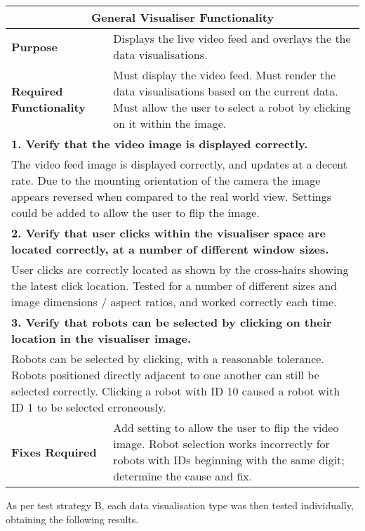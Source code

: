 \clearpage

\begin{longtable}{ l p{10cm} }
 \hline
 \multicolumn{2}{c}{\textbf{General Visualiser Functionality}}\\
 \hline
 \textbf{Purpose} & Displays the live video feed and overlays the the data visualisations.\\
 \textbf{Required Functionality} & Must display the video feed. Must render the data visualisations based on the current data. Must allow the user to select a robot by clicking on it within the image.\\
 \hline
 \multicolumn{2}{p{14cm}}{\textbf{1. Verify that the video image is displayed correctly.}}\\
 \multicolumn{2}{p{14cm}}{The video feed image is displayed correctly, and updates at a decent rate. Due to the mounting orientation of the camera the image appears reversed when compared to the real world view. Settings could be added to allow the user to flip the image. }\\
 \hline
 \multicolumn{2}{p{14cm}}{\textbf{2. Verify that user clicks within the visualiser space are located correctly, at a number of different window sizes.}}\\
 \multicolumn{2}{p{14cm}}{User clicks are correctly located as shown by the cross-hairs showing the latest click location. Tested for a number of different sizes and image dimensions / aspect ratios, and worked correctly each time.}\\
 \hline
 \multicolumn{2}{p{14cm}}{\textbf{3. Verify that robots can be selected by clicking on their location in the visualiser image.}}\\
 \multicolumn{2}{p{14cm}}{Robots can be selected by clicking, with a reasonable tolerance. Robots positioned directly adjacent to one another can still be selected correctly. Clicking a robot with ID 10 caused a robot with ID 1 to be selected erroneously.}\\
 \hline
 \textbf{Fixes Required} & Add setting to allow the user to flip the video image. Robot selection works incorrectly for robots with IDs beginning with the same digit; determine the cause and fix.\\
 \bottomrule
\end{longtable}

As per test strategy B, each data visualisation type was then tested individually, obtaining the following results.
\clearpage

